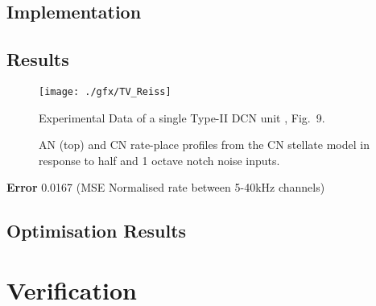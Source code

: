 \subsection{Implementation}



\clearpage
\subsection{Results} 

\begin{figure}[htb]
  \centering
\texttt{[image: ./gfx/TV\_Reiss]}
\caption{Experimental Data of a single Type-II DCN unit \citep{ReissYoung:2005}, Fig.~9.}
  \label{fig:TVReissFig9}
\end{figure}


\begin{figure}[tbh]
  \centering
%
\caption{AN (top) and CN rate-place profiles from the CN stellate
  model in response to half and 1 octave notch noise inputs. }
\label{fig:TVResults}
\end{figure}


\textbf{Error} 0.0167  (MSE Normalised rate between 5-40kHz channels)



\subsection{Optimisation Results}


\section{Verification}



